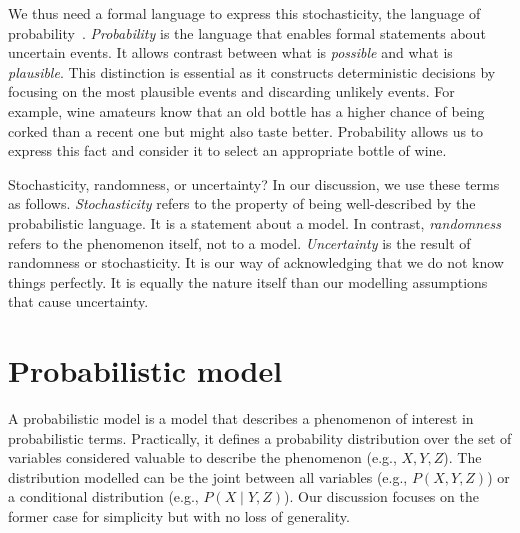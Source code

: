We thus need a formal language to express this stochasticity, the language of probability~\citep{kolmogorov2018foundations}. \textit{Probability} is the language that enables formal statements about uncertain events. It allows contrast between what is \textit{possible} and what is \textit{plausible}. This distinction is essential as it constructs deterministic decisions by focusing on the most plausible events and discarding unlikely events. For example, wine amateurs know that an old bottle has a higher chance of being corked than a recent one but might also taste better. Probability allows us to express this fact and consider it to select an appropriate bottle of wine.

\begin{side_note}{Stochasticity, randomness, or uncertainty?}
In our discussion, we use these terms as follows. \textit{Stochasticity} refers to the property of being well-described by the probabilistic language. It is a statement about a model. In contrast, \textit{randomness} refers to the phenomenon itself, not to a model. \textit{Uncertainty} is the result of randomness or stochasticity. It is our way of acknowledging that we do not know things perfectly. It is equally the nature itself than our modelling assumptions that cause uncertainty.
\end{side_note}

\section{Probabilistic model}
A probabilistic model is a model that describes a phenomenon of interest in probabilistic terms. Practically, it defines a probability distribution over the set of variables considered valuable to describe the phenomenon (e.g., $X, Y, Z$). The distribution modelled can be the joint between all variables (e.g., $P(X, Y, Z)$) or a conditional distribution  (e.g., $P(X \mid Y, Z)$). Our discussion focuses on the former case for simplicity but with no loss of generality.

